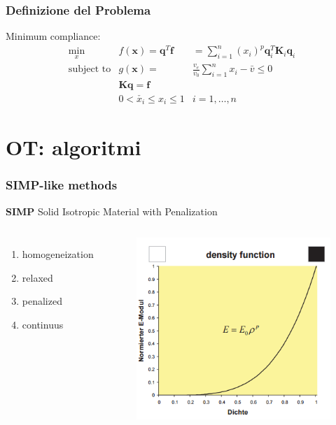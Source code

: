 \documentclass{beamer}
\begin{document}
\begin{frame}
	\frametitle{Definizione del Problema}
	Minimum compliance:
	\begin{eqnarray}
	\underset{x}{\text{min}} & f(\mathbf{x}) = \mathbf{q}^T \mathbf{f} & = \sum_{i=1}^{n}(x_i)^p \mathbf{q}_i^T \mathbf{K}_i \mathbf{q}_i \\
	\text{subject to} & g(\mathbf{x}) = & \frac{v_e}{v_0} \sum_{i=1}^{n}x_i - \bar{v} \leq 0 \\
	& \mathbf{K} \mathbf{q} = \mathbf{f} &  \\
	& 0 < \check{x_i} \leq x_i \leq 1  & i=1,\ldots, n
	\end{eqnarray}
			
	
\end{frame}

\section{OT: algoritmi}


\begin{frame}
	\frametitle{SIMP-like methods}
	\textbf{SIMP} Solid Isotropic Material with Penalization
	\begin{columns}[c] %
		
		\begin{enumerate}
			\item homogeneization
			\item relaxed
			\item penalized
			\item continuus
		\end{enumerate}
		
		\begin{figure}
			\includegraphics[width=0.7\linewidth]{./images/hom.png}
		\end{figure}
	\end{columns}		
\end{frame}
\end{document}
